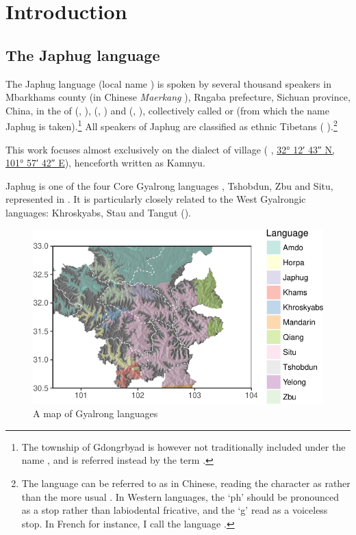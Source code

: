 \chapter{Introduction}

\section{The Japhug language}
The Japhug language (local name ) is spoken by several thousand speakers in Mbarkhams county (in Chinese \textit{Maerkang} ), Rngaba prefecture, Sichuan province, China, in the  of  (,  ),  (,  ) and  (,  ), collectively called  or  (from which the name Japhug is taken).\footnote{The township of Gdongrbyad is however not traditionally included under the name , and is referred instead by the term . }  All speakers of Japhug are classified as ethnic Tibetans ( ).\footnote{The language can be referred to as   in Chinese, reading the character  as   rather than the more usual . In Western languages, the `ph' should be pronounced as a stop rather than labiodental fricative, and the `g' read as a voiceless stop. In French for instance, I call the language . }

This work focuses almost exclusively on the dialect of  village ( , \href{https://geohack.toolforge.org/geohack.php?params=32.21181437468092_N_101.96170811415986_E}{32° 12′ 43″ N, 101° 57′ 42″ E}), henceforth written as Kamnyu.
  
Japhug is one of the four Core Gyalrong languages \citep{jackson00sidaba}, Tshobdun, Zbu and Situ, represented in . It is particularly closely related to the West Gyalrongic languages: Khroskyabs, Stau  and Tangut (\citealt{jackson00puxi, jacques17stau}).
    
 \begin{figure}
\caption{A map of Gyalrong languages} \label{fig:map.rgyalrong}
\includegraphics[width=\textwidth]{carte3.pdf}
\end{figure}

